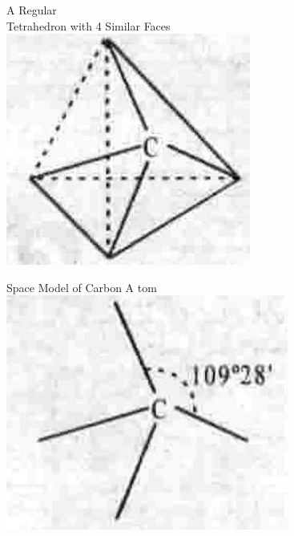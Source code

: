 \documentclass[10pt]{article}
\begin{document}
A Regular\\
Tetrahedron with 4 Similar Faces\\
\includegraphics[max width=\textwidth, center]{2025_01_28_8470952b98110cec3aabg-004(2)}

Space Model of Carbon A tom\\
\includegraphics[max width=\textwidth, center]{2025_01_28_8470952b98110cec3aabg-004}
\end{document}
